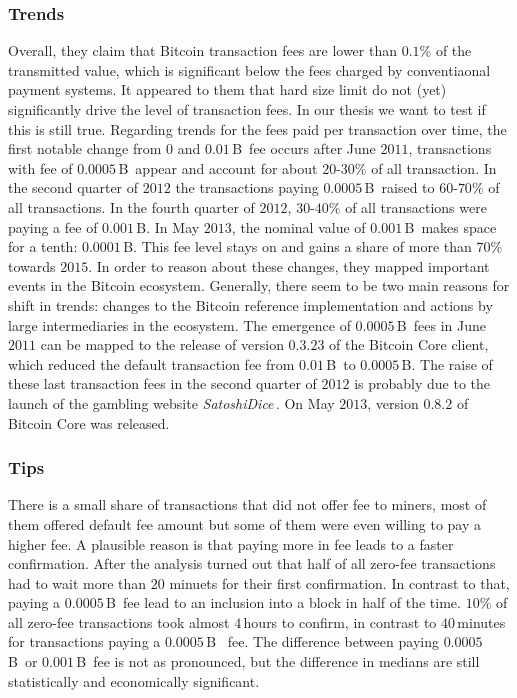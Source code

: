 \documentclass[USenglish]{uit-thesis}
\def\bitcoin{\leavevmode\rlap{\hskip.5pt-}B}
\begin{document}
\subsubsection{Trends}
Overall, they claim that Bitcoin transaction fees are lower than $0.1\%$ of
the transmitted value, which is significant below the fees charged
by conventiaonal payment systems. It appeared to them that hard size limit
do not (yet) significantly drive the level of transaction fees.
In our thesis we want to test if this is still true.
Regarding trends for the fees paid per transaction over time,
the first notable change from $0$ and $0.01$\,\bitcoin~fee
occurs after June $2011$, transactions
with fee of $0.0005$\,\bitcoin~appear and account for
about $20$-$30\%$ of all transaction. In the second quarter
of $2012$ the transactions paying $0.0005$\,\bitcoin~raised
to $60$-$70\%$ of all transactions. In the fourth quarter of
$2012$, $30$-$40\%$ of all transactions were paying a
fee of $0.001$\,\bitcoin. In May $2013$, the nominal value
of $0.001$\,\bitcoin~makes space for a tenth: $0.0001$\,\bitcoin.
This fee level stays on and gains a share of more than $70\%$
towards $2015$. In order to reason about these changes, they
mapped important events in the Bitcoin ecosystem. Generally,
there seem to be two main reasons for shift in trends:
changes to the Bitcoin reference implementation and actions by large
intermediaries in the ecosystem. The emergence of $0.0005$\,\bitcoin~fees
in June $2011$ can be mapped to the release of version $0.3.23$
of the Bitcoin Core client, which reduced the default transaction fee
from $0.01$\,\bitcoin~to $0.0005$\,\bitcoin. The raise of these
last transaction fees in the second quarter of $2012$ is probably
due to the launch of the gambling website \emph{SatoshiDice}\,\cite{satoshidice}.
On May $2013$, version $0.8.2$ of Bitcoin Core was released.

\subsubsection{Tips}
There is a small share of transactions that did not offer fee to miners,
most of them offered default fee amount but some of them
were even willing to pay a higher fee. A plausible reason
is that paying more in fee leads to a faster confirmation.
After the analysis turned out that half of all zero-fee transactions
had to wait more than $20$ minuets for their first confirmation.
In contrast to that, paying a $0.0005$\,\bitcoin~fee lead to an
inclusion into a block in half of the time. $10\%$ of all zero-fee
transactions took almost $4$\,hours to confirm, in contrast
to $40$\,minutes for transactions paying a $0.0005$\,\bitcoin~
fee. The difference between paying $0.0005$\,\bitcoin~or
$0.001$\,\bitcoin~fee is not as pronounced, but the difference
in medians are still statistically and economically significant.
\end{document}
